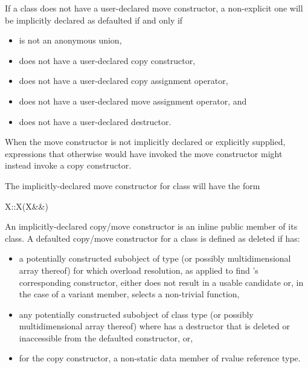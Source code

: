 \pnum
{}%
If a class  does not have
a user-declared move constructor, a non-explicit one will be
implicitly declared as defaulted if and only if
\begin{itemize}
\item
{} is not an anonymous union,

\item
{} does not have a user-declared copy constructor,

\item
{} does not have a user-declared copy assignment operator,

\item
{} does not have a user-declared move assignment operator, and

\item
{} does not have a user-declared destructor.
\end{itemize}

\begin{note}
When the move constructor is not implicitly declared or explicitly supplied,
expressions that otherwise would have invoked the move constructor might instead invoke
a copy constructor.
\end{note}

\pnum
The implicitly-declared move constructor for class  will have the form
\begin{codeblock}
X::X(X&&)
\end{codeblock}

\pnum
An implicitly-declared copy/move constructor is an
inline public member of its class.
A defaulted copy/\brk{}move constructor for a class
   is defined as deleted if  has:
\begin{itemize}
\item a potentially constructed subobject of type
   (or possibly multidimensional array thereof) for which
  overload resolution, as applied to find
  's corresponding constructor,
  either does not result in a usable candidate or,
  in the case of a variant member, selects a non-trivial function,

\item any potentially constructed subobject of
  class type  (or possibly multidimensional array thereof)
  where  has
  a destructor that is deleted or inaccessible from the defaulted
  constructor, or,

\item for the copy constructor, a non-static data member of rvalue reference type.
\end{itemize}

